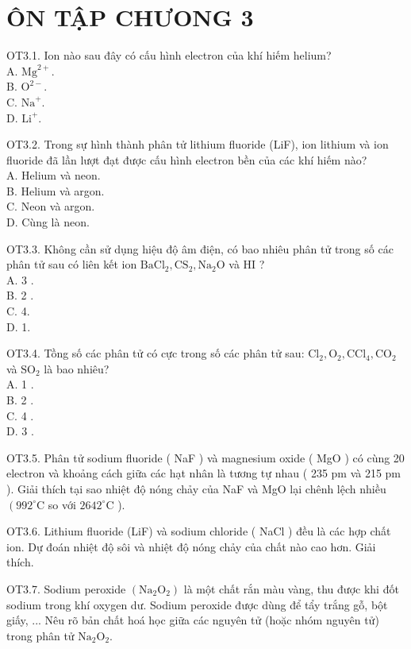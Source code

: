 \documentclass[10pt]{article}
\begin{document}
\section*{ÔN TẬP CHƯONG 3}
OT3.1. Ion nào sau đây có cấu hình electron của khí hiếm helium?\\
A. $\mathrm{Mg}^{2+}$.\\
B. $\mathrm{O}^{2-}$.\\
C. $\mathrm{Na}^{+}$.\\
D. $\mathrm{Li}^{+}$.

OT3.2. Trong sự hình thành phân tử lithium fluoride (LiF), ion lithium và ion fluoride đã lần lượt đạt được cấu hình electron bền của các khí hiếm nào?\\
A. Helium và neon.\\
B. Helium và argon.\\
C. Neon và argon.\\
D. Cùng là neon.

OT3.3. Không cần sử dụng hiệu độ âm điện, có bao nhiêu phân tử trong số các phân tử sau có liên kết ion $\mathrm{BaCl}_{2}, \mathrm{CS}_{2}, \mathrm{Na}_{2} \mathrm{O}$ và HI ?\\
A. 3 .\\
B. 2 .\\
C. 4.\\
D. 1.

OT3.4. Tồng số các phân tử có cực trong số các phân tử sau: $\mathrm{Cl}_{2}, \mathrm{O}_{2}, \mathrm{CCl}_{4}, \mathrm{CO}_{2}$ và $\mathrm{SO}_{2}$ là bao nhiêu?\\
A. 1 .\\
B. 2 .\\
C. 4 .\\
D. 3 .

OT3.5. Phân tử sodium fluoride ( NaF ) và magnesium oxide ( MgO ) có cùng 20 electron và khoảng cách giữa các hạt nhân là tương tự nhau ( 235 pm và 215 pm ). Giải thích tại sao nhiệt độ nóng chảy của NaF và MgO lại chênh lệch nhiều $\left(992^{\circ} \mathrm{C}\right.$ so với $2642^{\circ} \mathrm{C}$ ).

OT3.6. Lithium fluoride (LiF) và sodium chloride ( NaCl ) đều là các hợp chất ion. Dự đoán nhiệt độ sôi và nhiệt độ nóng chảy của chất nào cao hơn. Giải thích.

OT3.7. Sodium peroxide $\left(\mathrm{Na}_{2} \mathrm{O}_{2}\right)$ là một chất rắn màu vàng, thu được khi đốt sodium trong khí oxygen dư. Sodium peroxide được dùng để tẩy trắng gỗ, bột giấy, ... Nêu rõ bản chất hoá học giữa các nguyên tử (hoặc nhóm nguyên tử) trong phân tử $\mathrm{Na}_{2} \mathrm{O}_{2}$.
\end{document}
